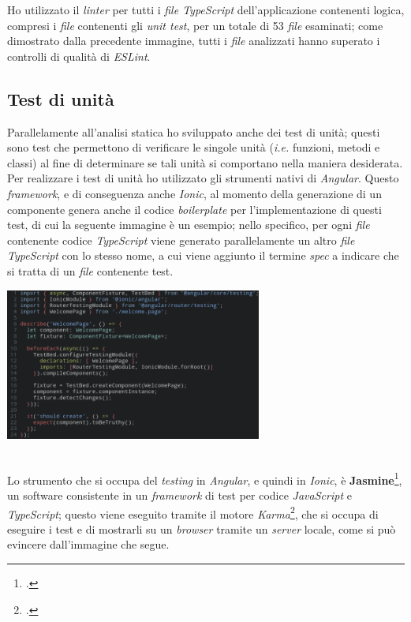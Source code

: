 Ho utilizzato il \textit{linter} per tutti i \textit{file TypeScript} dell'applicazione contenenti logica, compresi i \textit{file} contenenti gli \textit{unit test}, per un totale di 53 \textit{file} esaminati; come dimostrato dalla precedente immagine, tutti i \textit{file} analizzati hanno superato i controlli di qualità di \textit{ESLint}.

\subsection{Test di unità}

Parallelamente all'analisi statica ho sviluppato anche dei test di unità; questi sono test che permettono di verificare le singole unità (\textit{i.e.} funzioni, metodi e classi) al fine di determinare se tali unità si comportano nella maniera desiderata. \\
Per realizzare i test di unità ho utilizzato gli strumenti nativi di \textit{Angular}. Questo \textit{framework}, e di conseguenza anche \textit{Ionic}, al momento della generazione di un componente genera anche il codice \textit{boilerplate} per l'implementazione di questi test, di cui la seguente immagine è un esempio; nello specifico, per ogni \textit{file} contenente codice \textit{TypeScript} viene generato parallelamente un altro \textit{file TypeScript} con lo stesso nome, a cui viene aggiunto il termine \textit{spec} a indicare che si tratta di un \textit{file} contenente test. \\

\begin{minipage}{\linewidth}
  \centering
    \includegraphics[height=5cm]{immagini/jasminetest}
\end{minipage} \\

Lo strumento che si occupa del \textit{testing} in \textit{Angular}, e quindi in \textit{Ionic}, è \textbf{Jasmine}\footcite{tec:jasmine}, un software consistente in un \textit{framework} di test per codice \textit{JavaScript} e \textit{TypeScript}; questo viene eseguito tramite il motore \textit{Karma}\footcite{tec:karma}, che si occupa di eseguire i test e di mostrarli su un \textit{browser} tramite un \textit{server} locale, come si può evincere dall'immagine che segue.

